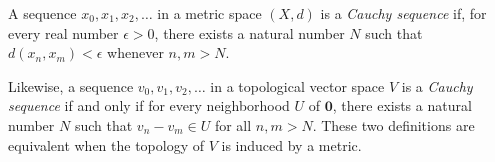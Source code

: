 \documentclass{article}
\begin{document}
A sequence $x_0, x_1, x_2, \dots$ in a metric space $(X,d)$ is a \emph{Cauchy sequence} if, for every real number $\epsilon > 0$, there exists a natural number $N$ such that $d(x_n,x_m) < \epsilon$ whenever $n,m > N$.

Likewise, a sequence $v_0, v_1, v_2, \dots$ in a topological vector space $V$ is a \emph{Cauchy sequence} if and only if for every neighborhood $U$ of $\mathbf{0}$, there exists a natural number $N$ such that $v_n - v_m \in U$ for all $n,m > N$. These two definitions are equivalent when the topology of $V$ is induced by a metric.
\end{document}
